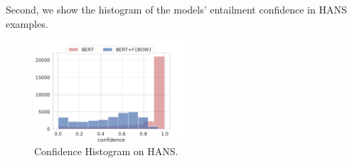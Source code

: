 Second, we show the histogram of the models' entailment confidence 
in HANS examples.

\begin{figure}
    \centering
    \includegraphics[width=0.5\textwidth]{figures/confidence_hans_hist.pdf}
    \caption{Confidence Histogram on HANS.}
    \label{fig:confidence_hans}
\end{figure}
